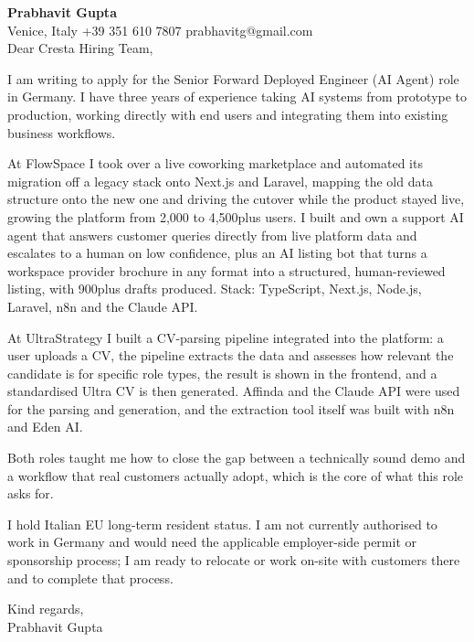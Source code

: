 \documentclass[a4paper,10.5pt]{article}
\begin{document}
\textbf{Prabhavit Gupta}\\
Venice, Italy \textbar{} +39 351 610 7807 \textbar{} prabhavitg@gmail.com\\[10pt]
Dear Cresta Hiring Team,

I am writing to apply for the Senior Forward Deployed Engineer (AI Agent) role in Germany. I have three years of experience taking AI systems from prototype to production, working directly with end users and integrating them into existing business workflows.

At FlowSpace I took over a live coworking marketplace and automated its migration off a legacy stack onto Next.js and Laravel, mapping the old data structure onto the new one and driving the cutover while the product stayed live, growing the platform from 2,000 to 4,500plus users. I built and own a support AI agent that answers customer queries directly from live platform data and escalates to a human on low confidence, plus an AI listing bot that turns a workspace provider brochure in any format into a structured, human-reviewed listing, with 900plus drafts produced. Stack: TypeScript, Next.js, Node.js, Laravel, n8n and the Claude API.

At UltraStrategy I built a CV-parsing pipeline integrated into the platform: a user uploads a CV, the pipeline extracts the data and assesses how relevant the candidate is for specific role types, the result is shown in the frontend, and a standardised Ultra CV is then generated. Affinda and the Claude API were used for the parsing and generation, and the extraction tool itself was built with n8n and Eden AI.

Both roles taught me how to close the gap between a technically sound demo and a workflow that real customers actually adopt, which is the core of what this role asks for.

I hold Italian EU long-term resident status. I am not currently authorised to work in Germany and would need the applicable employer-side permit or sponsorship process; I am ready to relocate or work on-site with customers there and to complete that process.

Kind regards,\\
Prabhavit Gupta
\end{document}
